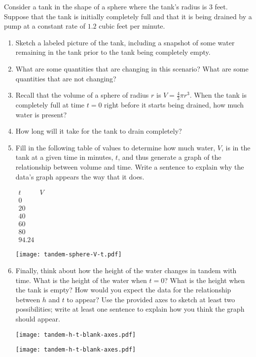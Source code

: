 \documentclass{ximera}
\begin{document}
\begin{exploration}

Consider a tank in the shape of a sphere where the tank's radius is $3$ feet.  Suppose that the tank is initially completely full and that it is being drained by a pump at a constant rate of $1.2$ cubic feet per minute.%

\begin{enumerate}[label=\alph*.]
\item Sketch a labeled picture of the tank, including a snapshot of some water remaining in the tank prior to the tank being completely empty.%
\item What are some quantities that are changing in this scenario?  What are some quantities that are not changing?%
\item Recall that the volume of a sphere of radius $r$ is $V = \frac{4}{3} \pi r^3$.  When the tank is completely full at time $t = 0$ right before it starts being drained, how much water is present?%
\item How long will it take for the tank to drain completely?%
\item Fill in the following table of values to determine how much water, $V$, is in the tank at a given time in minutes, $t$, and thus generate a graph of the relationship between volume and time.  Write a sentence to explain why the data's graph appears the way that it does.%

\begin{center}
$
\begin{array}{cc}
t&V\\
\hline
0&\\
20&\\
40&\\
60&\\
80&\\
94.24&
\end{array}
$
\end{center}

\begin{image}
\texttt{[image: tandem-sphere-V-t.pdf]}
\end{image}

\item Finally, think about how the height of the water changes in tandem with time. What is the height of the water when $t = 0$?  What is the height when the tank is empty?  How would you expect the data for the relationship between $h$ and $t$ to appear?  Use the provided axes to sketch at least two possibilities; write at least one sentence to explain how you think the graph should appear.%

\begin{image}
\texttt{[image: tandem-h-t-blank-axes.pdf]}
\end{image}

\begin{image}
\texttt{[image: tandem-h-t-blank-axes.pdf]}
\end{image}

\end{enumerate}
\end{exploration}
\end{document}
